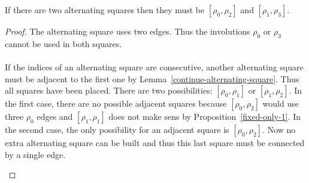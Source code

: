 \begin{lemma}
  If there are two alternating squares then they must be $[\rho_0, \rho_2]$ and $[\rho_1, \rho_3]$.
\end{lemma}

\begin{proof}
  The alternating square uses two edges. Thus the involutions $\rho_0$ or $\rho_3$ cannot be used in both squares.

  \paragraph{}
  If the indices of an alternating square are consecutive, another alternating square must be adjacent to the first one by Lemma~\ref{continue-alternating-square}. Thus all squares have been placed. There are two possibilities: $[\rho_0, \rho_1]$ or $[\rho_1, \rho_2]$. In the first case, there are no possible adjacent squares because $[\rho_0, \rho_2]$ would use three $\rho_0$ edges and $[\rho_1, \rho_1]$ does not make sens by Proposition~\ref{fixed-only-1}. In the second case, the only possibility for an adjacent square is $[\rho_0, \rho_2]$. Now no extra alternating square can be built and thus this last square must be connected by a single edge.

  \begin{figure}[H]
    \begin{center}
\end{center}
\end{figure}
\end{proof}
